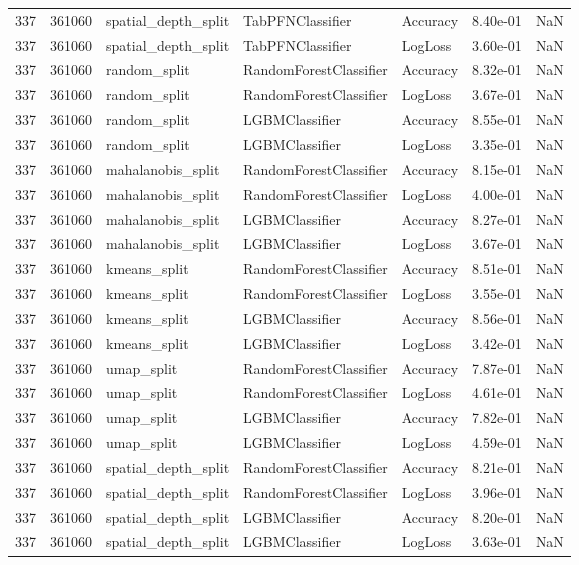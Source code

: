 \begin{tabular}{rrlllrr}
337 & 361060 & spatial\_depth\_split & TabPFNClassifier & Accuracy & 8.40e-01 & NaN \\
337 & 361060 & spatial\_depth\_split & TabPFNClassifier & LogLoss & 3.60e-01 & NaN \\
337 & 361060 & random\_split & RandomForestClassifier & Accuracy & 8.32e-01 & NaN \\
337 & 361060 & random\_split & RandomForestClassifier & LogLoss & 3.67e-01 & NaN \\
337 & 361060 & random\_split & LGBMClassifier & Accuracy & 8.55e-01 & NaN \\
337 & 361060 & random\_split & LGBMClassifier & LogLoss & 3.35e-01 & NaN \\
337 & 361060 & mahalanobis\_split & RandomForestClassifier & Accuracy & 8.15e-01 & NaN \\
337 & 361060 & mahalanobis\_split & RandomForestClassifier & LogLoss & 4.00e-01 & NaN \\
337 & 361060 & mahalanobis\_split & LGBMClassifier & Accuracy & 8.27e-01 & NaN \\
337 & 361060 & mahalanobis\_split & LGBMClassifier & LogLoss & 3.67e-01 & NaN \\
337 & 361060 & kmeans\_split & RandomForestClassifier & Accuracy & 8.51e-01 & NaN \\
337 & 361060 & kmeans\_split & RandomForestClassifier & LogLoss & 3.55e-01 & NaN \\
337 & 361060 & kmeans\_split & LGBMClassifier & Accuracy & 8.56e-01 & NaN \\
337 & 361060 & kmeans\_split & LGBMClassifier & LogLoss & 3.42e-01 & NaN \\
337 & 361060 & umap\_split & RandomForestClassifier & Accuracy & 7.87e-01 & NaN \\
337 & 361060 & umap\_split & RandomForestClassifier & LogLoss & 4.61e-01 & NaN \\
337 & 361060 & umap\_split & LGBMClassifier & Accuracy & 7.82e-01 & NaN \\
337 & 361060 & umap\_split & LGBMClassifier & LogLoss & 4.59e-01 & NaN \\
337 & 361060 & spatial\_depth\_split & RandomForestClassifier & Accuracy & 8.21e-01 & NaN \\
337 & 361060 & spatial\_depth\_split & RandomForestClassifier & LogLoss & 3.96e-01 & NaN \\
337 & 361060 & spatial\_depth\_split & LGBMClassifier & Accuracy & 8.20e-01 & NaN \\
337 & 361060 & spatial\_depth\_split & LGBMClassifier & LogLoss & 3.63e-01 & NaN \\

\end{tabular}
